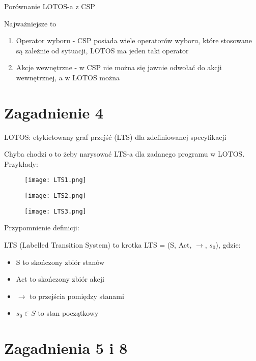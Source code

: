 \documentclass[a4paper,15pt]{article}
\newcommand{\example}[2]{
    \begin{tcolorbox}[colback=blue!5!white,colframe=blue,title={Przykład #1}]
        #2
    \end{tcolorbox}
}
\newcommand{\issue}[2]{
    \begin{tcolorbox}[colback=issueColor!5!white,colframe=issueColor,title={Zagadnienie #1}]
        #2
    \end{tcolorbox}
}
\begin{document}
\issue{Bonus}{
Porównanie LOTOS-a z CSP 
}

Najważniejsze to
\begin{enumerate}
\item Operator wyboru - CSP posiada wiele operatorów wyboru, które stosowane są zależnie od sytuacji, LOTOS ma jeden taki operator
\item Akcje wewnętrzne - w CSP nie można się jawnie odwołać do akcji wewnętrznej, a w LOTOS można
\end{enumerate}

\newpage
\section{Zagadnienie 4}

\issue{4}{
LOTOS: etykietowany graf przejść (LTS) dla zdefiniowanej
specyfikacji
}

Chyba chodzi o to żeby narysować LTS-a dla zadanego programu w LOTOS. Przykłady:

\example{}{
\begin{figure}[H]
\centerline{\texttt{[image: LTS1.png]}}
\end{figure}\begin{figure}[H]
\centerline{\texttt{[image: LTS2.png]}}
\end{figure}
}

\example{}{
\begin{figure}[H]
\centerline{\texttt{[image: LTS3.png]}}
\end{figure}
}

\begin{framed}
Przypomnienie definicji:

LTS (Labelled Transition System) to krotka LTS = (S, Act, $\rightarrow$, $s_0$), gdzie:
\begin{itemize}
\item S to skończony zbiór stanów
\item Act to skończony zbiór akcji
\item $\rightarrow$ to przejścia pomiędzy stanami 
\item $s_0 \in S$ to stan początkowy 
\end{itemize}
\end{framed}


\newpage
\section{Zagadnienia 5 i 8}
\end{document}
